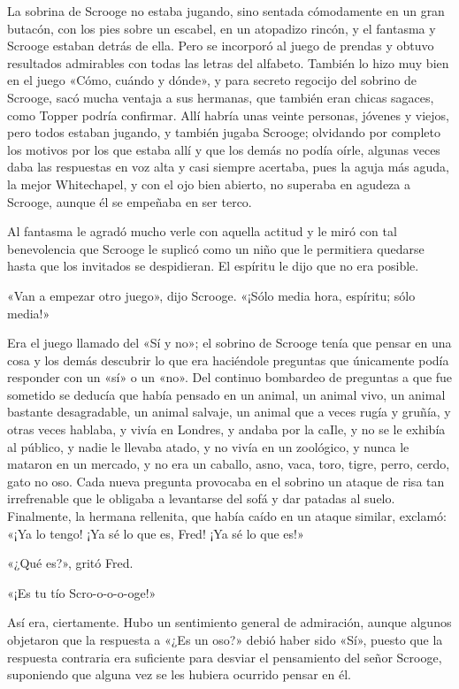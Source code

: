\documentclass{novela}
\begin{document}
 La sobrina de Scrooge no estaba jugando, sino sentada cómodamente en un gran butacón, con los pies sobre un escabel, en un atopadizo rincón, y el fantasma y Scrooge estaban detrás de ella. Pero se incorporó al juego de prendas y obtuvo resultados admirables con todas las letras del alfabeto. También lo hizo muy bien en el juego «Cómo, cuándo y dónde», y para secreto regocijo del sobrino de Scrooge, sacó mucha ventaja a sus hermanas, que también eran chicas sagaces, como Topper podría confirmar. Allí habría unas veinte personas, jóvenes y viejos, pero todos estaban jugando, y también jugaba Scrooge; olvidando por completo los motivos por los que estaba allí y que los demás no podía oírle, algunas veces daba las respuestas en voz alta y casi siempre acertaba, pues la aguja más aguda, la mejor Whitechapel, y con el ojo bien abierto, no superaba en agudeza a Scrooge, aunque él se empeñaba en ser terco.

 Al fantasma le agradó mucho verle con aquella actitud y le miró con tal benevolencia que Scrooge le suplicó como un niño que le permitiera quedarse hasta que los invitados se despidieran. El espíritu le dijo que no era posible.

 «Van a empezar otro juego», dijo Scrooge. «¡Sólo media hora, espíritu; sólo media!»

 Era el juego llamado del «Sí y no»; el sobrino de Scrooge tenía que pensar en una cosa y los demás descubrir lo que era haciéndole preguntas que únicamente podía responder con un «sí» o un «no». Del continuo bombardeo de preguntas a que fue sometido se deducía que había pensado en un animal, un animal vivo, un animal bastante desagradable, un animal salvaje, un animal que a veces rugía y gruñía, y otras veces hablaba, y vivía en Londres, y andaba por la caIle, y no se le exhibía al público, y nadie le llevaba atado, y no vivía en un zoológico, y nunca le mataron en un mercado, y no era un caballo, asno, vaca, toro, tigre, perro, cerdo, gato no oso. Cada nueva pregunta provocaba en el sobrino un ataque de risa tan irrefrenable que le obligaba a levantarse del sofá y dar patadas al suelo. Finalmente, la hermana rellenita, que había caído en un ataque similar, exclamó: «¡Ya lo tengo! ¡Ya sé lo que es, Fred! ¡Ya sé lo que es!»

 «¿Qué es?», gritó Fred.

 «¡Es tu tío Scro-o-o-o-oge!»

 Así era, ciertamente. Hubo un sentimiento general de admiración, aunque algunos objetaron que la respuesta a «¿Es un oso?» debió haber sido «Sí», puesto que la respuesta contraria era suficiente para desviar el pensamiento del señor Scrooge, suponiendo que alguna vez se les hubiera ocurrido pensar en él.
\end{document}
